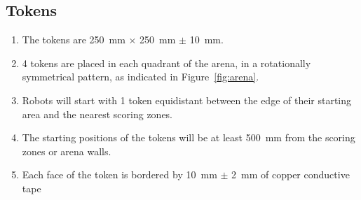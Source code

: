 \subsection{Tokens}
\label{spec:tokens}

\begin{enumerate}
  \item The tokens are \SI{250}{mm} $\times$ \SI{250}{mm} $\pm$ \SI{10}{mm}.
  \item 4 tokens are placed in each quadrant of the arena, in a rotationally
        symmetrical pattern, as indicated in Figure~\ref{fig:arena}.
  \item Robots will start with 1 token equidistant between the edge of their
        starting area and the nearest scoring zones.
  \item The starting positions of the tokens will be at least \SI{500}{mm} from the
        scoring zones or arena walls.
  \item Each face of the token is bordered by \SI{10}{mm} $\pm$ \SI{2}{mm} of
        copper conductive tape
\end{enumerate}
